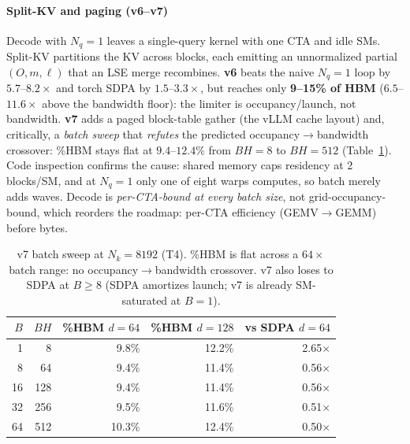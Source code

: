 \paragraph{Split-KV and paging (v6--v7)}
Decode with $N_q{=}1$ leaves a single-query kernel with one CTA and idle SMs.
Split-KV partitions the KV across blocks, each emitting an unnormalized partial
$(O, m, \ell)$ that an LSE merge recombines. \textbf{v6} beats the naive
$N_q{=}1$ loop by $5.7$--$8.2\times$ and torch SDPA by $1.5$--$3.3\times$, but
reaches only \textbf{9--15\% of HBM} ($6.5$--$11.6\times$ above the bandwidth
floor): the limiter is occupancy/launch, not bandwidth. \textbf{v7} adds a paged
block-table gather (the vLLM cache layout) and, critically, a \emph{batch
sweep} that \emph{refutes} the predicted occupancy$\to$bandwidth crossover: \%HBM
stays flat at $9.4$--$12.4\%$ from $BH{=}8$ to $BH{=}512$
(Table~\ref{tab:v7batch}). Code inspection confirms the cause: shared memory
caps residency at 2 blocks/SM, and at $N_q{=}1$ only one of eight warps computes,
so batch merely adds waves. Decode is \emph{per-CTA-bound at every batch size},
not grid-occupancy-bound, which reorders the roadmap: per-CTA efficiency
(GEMV$\to$GEMM) before bytes.

\begin{table}[t]
  \centering
  \caption{v7 batch sweep at $N_k{=}8192$ (T4). \%HBM is flat across a
  $64\times$ batch range: no occupancy$\to$bandwidth crossover. v7 also loses to
  SDPA at $B{\ge}8$ (SDPA amortizes launch; v7 is already SM-saturated at $B{=}1$).}
  \label{tab:v7batch}
  \small
  \begin{tabular}{rrrrr}
    \toprule
    $B$ & $BH$ & \%HBM $d{=}64$ & \%HBM $d{=}128$ & vs SDPA $d{=}64$ \\
    \midrule
    1  & 8   & 9.8\%  & 12.2\% & 2.65$\times$ \\
    8  & 64  & 9.4\%  & 11.4\% & 0.56$\times$ \\
    16 & 128 & 9.4\%  & 11.4\% & 0.56$\times$ \\
    32 & 256 & 9.5\%  & 11.6\% & 0.51$\times$ \\
    64 & 512 & 10.3\% & 12.4\% & 0.50$\times$ \\
    \bottomrule
  \end{tabular}
\end{table}


